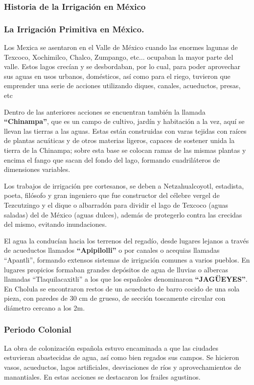 \subsubsection{Historia de la Irrigación en México}

\subsubsection*{La Irrigación Primitiva en México.}
Los Mexica se asentaron en el Valle de México cuando las enormes lagunas de Texcoco, Xochimilco, Chalco, Zumpango, etc$\dots$ ocupaban la mayor parte del valle. Estos lagos crecían y se desbordaban, por lo cual, para poder aprovechar sus aguas en usos urbanos, domésticos, así como para el riego, tuvieron que emprender una serie de acciones utilizando diques, canales, acueductos, presas, etc

Dentro de las anteriores acciones se encuentran también la llamada \textbf{``Chinampa''}, que es un campo de cultivo, jardín y habitación a la vez, aquí se llevan las tierras a las aguas. Estas están construidas con varas tejidas con raíces de plantas acuáticas y de otros materias ligeros, capaces de sostener unida la tierra de la Chinampa; sobre esta base se colocan ramas de las mismas plantas y encima el fango que sacan del fondo del lago, formando cuadriláteros de dimensiones variables.

Los trabajos de irrigación pre cortesanos, se deben a Netzahualcoyotl, estadista, poeta, filósofo y gran ingeniero que fue constructor del célebre vergel de Tezcutzingo y el dique o albarradón para dividir el lago de Texcoco (aguas saladas) del de México (aguas dulces), además de protegerlo contra las crecidas del mismo, evitando inundaciones.

El agua la conducían hacia los terrenos del regadío, desde lugares lejanos a través de acueductos llamados \textbf{``Apipilolli''} o por canales o acequias llamadas ``Apantli'', formando extensos sistemas de irrigación comunes a varios pueblos. En lugares propicios formaban grandes depósitos de agua de lluvias o albercas llamadas ``Tlaquilacaxitli'' a los que los españoles denominaron \textbf{``JAGÜEYES''}. En Cholula se encontraron restos de un acueducto de barro cocido de una sola pieza, con paredes de 30 cm de grueso, de sección toscamente circular con diámetro cercano a los 2m.
\subsubsection{Periodo Colonial}
La obra de colonización española estuvo encaminada a que las ciudades estuvieran abastecidas de agua, así como bien regados sus campos. Se hicieron vasos, acueductos, lagos artificiales, desviaciones de ríos y aprovechamientos de manantiales. En estas acciones se destacaron los frailes agustinos.

